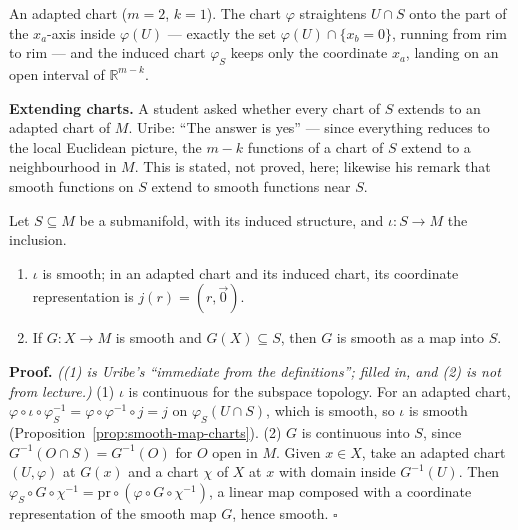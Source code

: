 \documentclass[11pt]{report}
\makeatletter
\newcounter{thmcounter}[section]
\renewenvironment{proof}[1][Proof]{\noindent\textbf{#1.} }{\hfill$\square$\par\vspace{5pt}}
\newcommand{\thmlabel}[1]{\edef\@currentlabel{\arabic{section}.\arabic{thmcounter}}\label{#1}}
\newcommand{\leeref}[1]{\par\smallskip{\raggedleft\footnotesize\textsc{Lee}:\ #1\par}}
\makeatother
\begin{document}
An adapted chart ($m = 2$, $k = 1$). The chart $\varphi$ straightens $U \cap S$ onto the part of the $x_a$-axis inside $\varphi(U)$ --- exactly the set $\varphi(U) \cap \{x_b = 0\}$, running from rim to rim --- and the induced chart $\varphi_S$ keeps only the coordinate $x_a$, landing on an open interval of $\mathbb{R}^{m-k}$.

\textbf{Extending charts.} A student asked whether every chart of $S$ extends to an adapted chart of $M$. Uribe: ``The answer is yes'' --- since everything reduces to the local Euclidean picture, the $m - k$ functions of a chart of $S$ extend to a neighbourhood in $M$. This is stated, not proved, here; likewise his remark that smooth functions on $S$ extend to smooth functions near $S$.

\begin{lembox}\thmlabel{lem:maps-into-submanifold}
Let $S \subseteq M$ be a submanifold, with its induced structure, and $\iota : S \to M$ the inclusion.
\begin{enumerate}
    \item $\iota$ is smooth; in an adapted chart and its induced chart, its coordinate representation is $j(r) = (r, \vec 0)$.
    \item If $G : X \to M$ is smooth and $G(X) \subseteq S$, then $G$ is smooth as a map into $S$.
\end{enumerate}
\leeref{Corollary 5.30}
\end{lembox}

\begin{proof}
\textit{((1) is Uribe's ``immediate from the definitions''; filled in, and (2) is not from lecture.)} (1) $\iota$ is continuous for the subspace topology. For an adapted chart, $\varphi \circ \iota \circ \varphi_S^{-1} = \varphi \circ \varphi^{-1} \circ j = j$ on $\varphi_S(U \cap S)$, which is smooth, so $\iota$ is smooth (Proposition~\ref{prop:smooth-map-charts}). (2) $G$ is continuous into $S$, since $G^{-1}(O \cap S) = G^{-1}(O)$ for $O$ open in $M$. Given $x \in X$, take an adapted chart $(U, \varphi)$ at $G(x)$ and a chart $\chi$ of $X$ at $x$ with domain inside $G^{-1}(U)$. Then $\varphi_S \circ G \circ \chi^{-1} = \mathrm{pr} \circ (\varphi \circ G \circ \chi^{-1})$, a linear map composed with a coordinate representation of the smooth map $G$, hence smooth.
\end{proof}

\begin{center}
\qquad\qquad
{}
\end{center}
\end{document}
